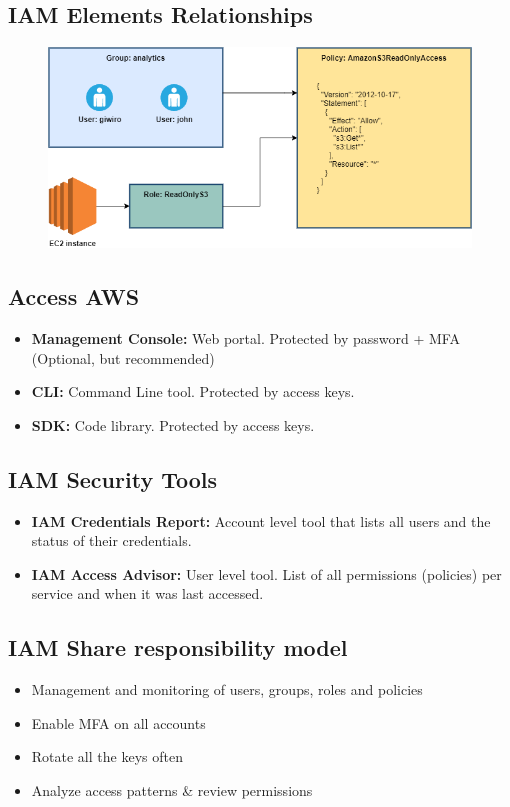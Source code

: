 \subsection{IAM Elements Relationships}\label{subsec:iam-elements-relationships}
\begin{figure}[h]
    \includegraphics[scale=0.5]{iam/iam}
    \centering
    \label{fig:iam-elements-relationships}
\end{figure}

\subsection{Access AWS}\label{subsec:access-aws}
\begin{itemize}
	\item{\textbf{Management Console:}} Web portal.
	    Protected by password + MFA {(Optional, but recommended)}
	\item{\textbf{CLI:}} Command Line tool.
        Protected by access keys.
	\item{\textbf{SDK:}} Code library.
        Protected by access keys.
\end{itemize}

\subsection{IAM Security Tools}\label{subsec:iam-security-tools}
\begin{itemize}
	\item{\textbf{IAM Credentials Report:}} Account level tool that lists all users and the status of their credentials.
    \item{\textbf{IAM Access Advisor:}} User level tool.
        List of all permissions (policies) per service and when it was last accessed.
\end{itemize}

\subsection{IAM Share responsibility model}\label{subsec:iam-share-responsibility-model}
\begin{itemize}
	\item{Management and monitoring of users, groups, roles and policies}
	\item{Enable MFA on all accounts}
	\item{Rotate all the keys often}
	\item{Analyze access patterns \& review permissions}
\end{itemize}
